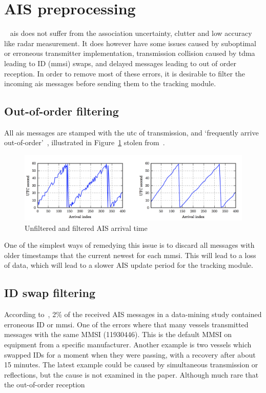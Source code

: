\section{AIS preprocessing}~\label{sec:ais_preprocessing}
\Gls{ais} does not suffer from the association uncertainty, clutter and low accuracy like radar measurement. It does however have some issues caused by suboptimal or erroneous transmitter implementation, transmission collision caused by \gls{tdma} leading to ID (\gls{mmsi}) swaps, and delayed messages leading to out of order reception. In order to remove most of these errors, it is desirable to filter the incoming \gls{ais} messages before sending them to the tracking module.

\subsection{Out-of-order filtering}
All \gls{ais} messages are stamped with the \gls{utc} of transmission, and `frequently arrive out-of-order'~\cite{Wilthil}, illustrated in Figure~\ref{fig:out_of_order_ais} stolen from~\cite{Wilthil}.
\begin{figure}[H]
\centering
\includegraphics[width = .9\textwidth]{Figures/out_of_order_ais.png}
\caption{Unfiltered and filtered AIS arrival time}\label{fig:out_of_order_ais}
\end{figure}
One of the simplest ways of remedying this issue is to discard all messages with older timestamps that the current newest for each \gls{mmsi}. This will lead to a loss of data, which will lead to a slower AIS update period for the tracking module.

\subsection{ID swap filtering}
According to~\cite{Harati-Mokhtari2007}, 2\% of the received AIS messages in a data-mining study contained erroneous ID or \gls{mmsi}. One of the errors where that many vessels transmitted messages with the same MMSI (11930446). This is the default MMSI on equipment from a specific manufacturer. Another example is two vessels which swapped IDs for a moment when they were passing, with a recovery after about 15 minutes. The latest example could be caused by simultaneous transmission or reflections, but the cause is not examined in the paper. Although much rare that the out-of-order reception   

